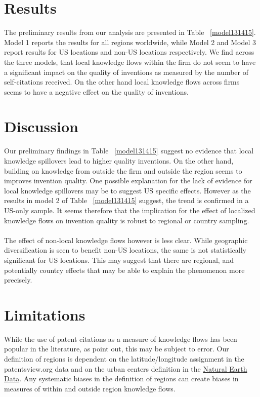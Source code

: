 \documentclass[10pt,letterpaper]{article}
\begin{document}
\section*{Results}
The preliminary results from our analysis are presented in Table ~\ref{model131415}. Model 1 reports the results for all regions worldwide, while Model 2 and Model 3 report results for US locations and non-US locations respectively. We find across the three models, that local knowledge flows within the firm do not seem to have a significant impact on the quality of inventions as measured by the number of self-citations received. On the other hand local knowledge flows across firms seems to have a negative effect on the quality of inventions. 

\section*{Discussion}
Our preliminary findings in Table ~\ref{model131415} suggest no evidence that local knowledge spillovers lead to higher quality inventions. On the other hand, building on knowledge from outside the firm and outside the region seems to improves invention quality. One possible explanation for the lack of evidence for local knowledge spillovers may be to suggest US specific effects. However as the results in model 2 of Table ~\ref{model131415} suggest, the trend is confirmed in a US-only sample. It seems therefore that the implication for the effect of localized knowledge flows on invention quality is robust to regional or country sampling. 
\\\\
The effect of non-local knowledge flows however is less clear. While geographic diversification is seen to benefit non-US locations, the same is not statistically significant for US locations. This may suggest that there are regional, and potentially country effects that may be able to explain the phenomenon more precisely.

\section*{Limitations}
While the use of patent citations as a measure of knowledge flows has been popular in the literature, as \cite{Arora2017} point out, this may be subject to error. Our definition of regions is dependent on the latitude/longitude assignment in the patentsview.org data and on the urban centers definition in the \href{http://www.naturalearthdata.com/downloads/10m-cultural-vectors/}{Natural Earth Data}. Any systematic biases in the definition of regions can create biases in measures of within and outside region knowledge flows. 
\end{document}
